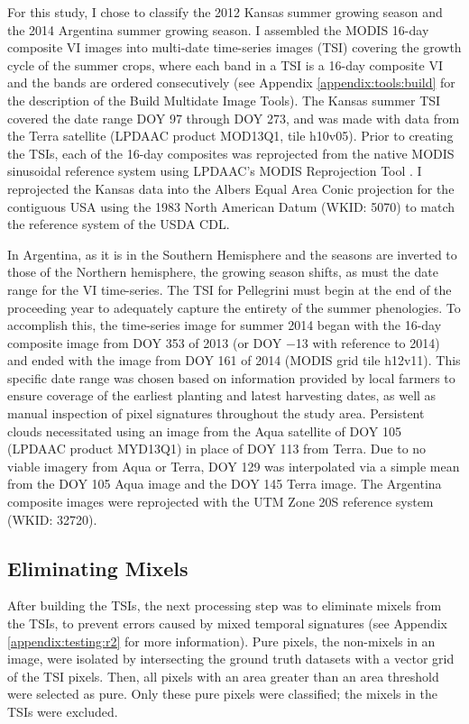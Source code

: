 For this study, I chose to classify the 2012 Kansas summer growing season and the 2014 Argentina summer growing season. I assembled the MODIS 16-day composite VI images into multi-date time-series images (TSI) covering the growth cycle of the summer crops, where each band in a TSI is a 16-day composite VI and the bands are ordered consecutively (see Appendix \ref{appendix:tools:build} for the description of the Build Multidate Image Tools). The Kansas summer TSI covered the date range DOY 97 through DOY 273, and was made with data from the Terra satellite (LPDAAC product MOD13Q1, tile h10v05). Prior to creating the TSIs, each of the 16-day composites was reprojected from the native MODIS sinusoidal reference system using LPDAAC's MODIS Reprojection Tool \autocite{modis4.1}. I reprojected the Kansas data into the Albers Equal Area Conic projection for the contiguous USA using the 1983 North American Datum (WKID: 5070) to match the reference system of the USDA CDL.

In Argentina, as it is in the Southern Hemisphere and the seasons are inverted to those of the Northern hemisphere, the growing season shifts, as must the date range for the VI time-series. The TSI for Pellegrini must begin at the end of the proceeding year to adequately capture the entirety of the summer phenologies. To accomplish this, the time-series image for summer 2014 began with the 16-day composite image from DOY 353 of 2013 (or DOY −13 with reference to 2014) and ended with the image from DOY 161 of 2014 (MODIS grid tile h12v11). This specific date range was chosen based on information provided by local farmers to ensure coverage of the earliest planting and latest harvesting dates, as well as manual inspection of pixel signatures throughout the study area. Persistent clouds necessitated using an image from the Aqua satellite of DOY 105 (LPDAAC product MYD13Q1) in place of DOY 113 from Terra. Due to no viable imagery from Aqua or Terra, DOY 129 was interpolated via a simple mean from the DOY 105 Aqua image and the DOY 145 Terra image. The Argentina composite images were reprojected with the UTM Zone 20S reference system (WKID: 32720).

\subsection{Eliminating Mixels}

After building the TSIs, the next processing step was to eliminate mixels from the TSIs, to prevent errors caused by mixed temporal signatures (see Appendix \ref{appendix:testing:r2} for more information). Pure pixels, the non-mixels in an image, were isolated by intersecting the ground truth datasets with a vector grid of the TSI pixels. Then, all pixels with an area greater than an area threshold were selected as pure. Only these pure pixels were classified; the mixels in the TSIs were excluded.

